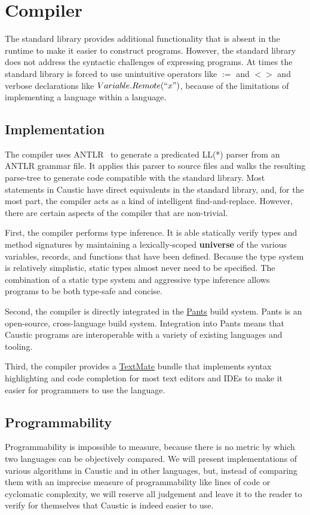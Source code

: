 \documentclass[../main.tex]{subfiles}
\begin{document}
\section{Compiler}
The standard library provides additional functionality that is absent in the runtime to make it
easier to construct programs. However, the standard library does not address the syntactic
challenges of expressing programs. At times the standard library is forced to use unintuitive
operators like $:=$ and $<>$ and verbose declarations like $Variable.Remote(``x")$, because of the
limitations of implementing a language within a language.

  \subsection{Implementation}
  The compiler uses ANTLR~\cite{antlr} to generate a predicated LL(*) parser from an ANTLR grammar
  file. It applies this parser to source files and walks the resulting parse-tree to generate code
  compatible with the standard library. Most statements in Caustic have direct equivalents in the
  standard library, and, for the most part, the compiler acts as a kind of intelligent
  find-and-replace. However, there are certain aspects of the compiler that are non-trivial.

  First, the compiler performs type inference. It is able statically verify types and method
  signatures by maintaining a lexically-scoped \textbf{universe} of the various variables, records,
  and functions that have been defined. Because the type system is relatively simplistic, static
  types almost never need to be specified. The combination of a static type system and aggressive
  type inference allows programs to be both type-safe and concise.

  Second, the compiler is directly integrated in the \href{https://www.pantsbuild.org/}{Pants} build
  system. Pants is an open-source, cross-language build system. Integration into Pants means that
  Caustic programs are interoperable with a variety of existing languages and tooling.

  Third, the compiler provides a \href{https://macromates.com/}{TextMate} bundle that implements
  syntax highlighting and code completion for most text editors and IDEs to make it easier for
  programmers to use the language.

  \subsection{Programmability}
  Programmability is impossible to measure, because there is no metric by which two languages can be
  objectively compared. We will present implementations of various algorithms in Caustic and in
  other languages, but, instead of comparing them with an imprecise measure of programmability like
  lines of code or cyclomatic complexity, we will reserve all judgement and leave it to the reader
  to verify for themselves that Caustic is indeed easier to use.
\end{document}

